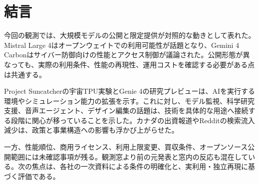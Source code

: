\section*{結言}
今回の観測では、大規模モデルの公開と限定提供が対照的な動きとして表れた。Mistral Large 4はオープンウェイトでの利用可能性が話題となり、Gemini 4 Carbonはサイバー防御向けの性能とアクセス制御が議論された。公開形態が異なっても、実際の利用条件、性能の再現性、運用コストを確認する必要がある点は共通する。

Project Suncatcherの宇宙TPU実験とGenie 4の研究プレビューは、AIを実行する環境やシミュレーション能力の拡張を示す。これに対し、モデル監視、科学研究支援、音声エージェント、デザイン編集の話題は、技術を具体的な用途へ接続する段階に関心が移っていることを示した。カナダの出資報道やRedditの検索流入減少は、政策と事業構造への影響も浮かび上がらせた。

一方、性能順位、商用ライセンス、利用上限変更、買収条件、オープンソース公開範囲には未確認事項が残る。観測窓より前の元発表と窓内の反応も混在している。次の焦点は、各社の一次資料による条件の明確化と、実利用・独立再現に基づく評価である。
